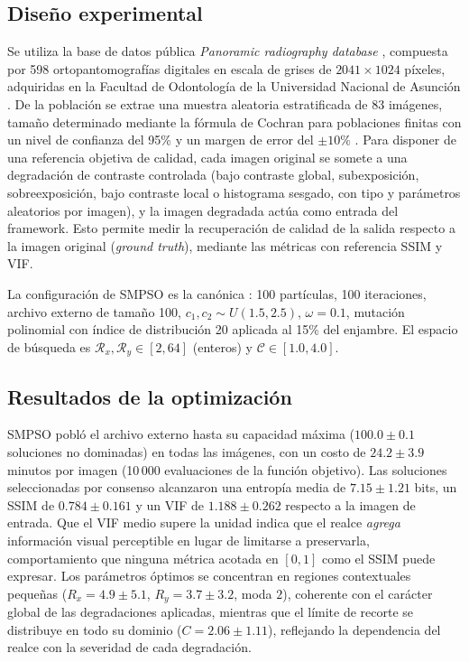 \documentclass[sigplan,screen]{acmart}
\begin{document}
\subsection{Diseño experimental}
Se utiliza la base de datos pública \textit{Panoramic radiography database} \cite{Fretes2021}, compuesta por 598 ortopantomografías digitales en escala de grises de $2041\times 1024$ píxeles, adquiridas en la Facultad de Odontología de la Universidad Nacional de Asunción \cite{MelloRoman2021}. De la población se extrae una muestra aleatoria estratificada de 83 imágenes, tamaño determinado mediante la fórmula de Cochran para poblaciones finitas con un nivel de confianza del 95\% y un margen de error del $\pm 10\%$ \cite{Cochran1977}. Para disponer de una referencia objetiva de calidad, cada imagen original se somete a una degradación de contraste controlada (bajo contraste global, subexposición, sobreexposición, bajo contraste local o histograma sesgado, con tipo y parámetros aleatorios por imagen), y la imagen degradada actúa como entrada del framework. Esto permite medir la recuperación de calidad de la salida respecto a la imagen original (\textit{ground truth}), mediante las métricas con referencia SSIM y VIF.\par
La configuración de SMPSO es la canónica \cite{Nebro2009}: 100 partículas, 100 iteraciones, archivo externo de tamaño 100, $c_1,c_2\sim U(1.5,2.5)$, $\omega=0.1$, mutación polinomial con índice de distribución 20 aplicada al 15\% del enjambre. El espacio de búsqueda es $\mathcal{R}_x,\mathcal{R}_y\in[2,64]$ (enteros) y $\mathcal{C}\in[1.0,4.0]$.

\subsection{Resultados de la optimización}
SMPSO pobló el archivo externo hasta su capacidad máxima ($100.0\pm 0.1$ soluciones no dominadas) en todas las imágenes, con un costo de $24.2\pm 3.9$ minutos por imagen (10\,000 evaluaciones de la función objetivo). Las soluciones seleccionadas por consenso alcanzaron una entropía media de $7.15\pm 1.21$ bits, un SSIM de $0.784\pm 0.161$ y un VIF de $1.188\pm 0.262$ respecto a la imagen de entrada. Que el VIF medio supere la unidad indica que el realce \textit{agrega} información visual perceptible en lugar de limitarse a preservarla, comportamiento que ninguna métrica acotada en $[0,1]$ como el SSIM puede expresar. Los parámetros óptimos se concentran en regiones contextuales pequeñas ($R_x=4.9\pm 5.1$, $R_y=3.7\pm 3.2$, moda $2$), coherente con el carácter global de las degradaciones aplicadas, mientras que el límite de recorte se distribuye en todo su dominio ($C=2.06\pm 1.11$), reflejando la dependencia del realce con la severidad de cada degradación.
\end{document}

